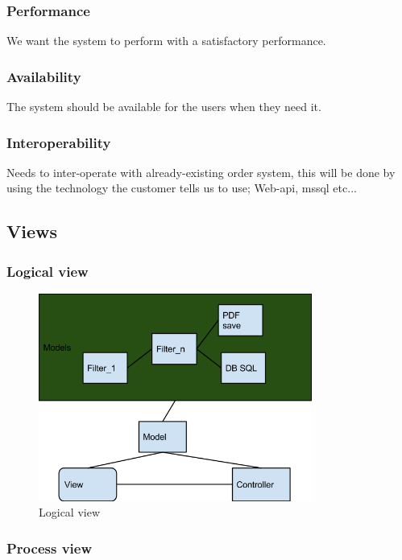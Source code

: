 \subsubsection{Performance}
We want the system to perform with a satisfactory performance.
\subsubsection{Availability}
The system should be available for the users when they need it.
\subsubsection{Interoperability}
Needs to inter-operate with already-existing order system, this will be done by using the technology the customer tells us to use; Web-api, mssql etc...

\subsection{Views}

\subsubsection{Logical view}
\begin{figure}[h]
\centering
\includegraphics[width=0.8\textwidth]{images/architecture00.png}
\caption{Logical view}
\label{fig:logical_view}
\end{figure}
\subsubsection{Process view}
\newpage
